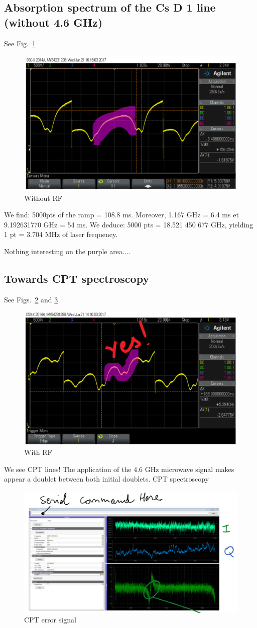 \documentclass[a4paper,11pt]{article}
\begin{document}
\subsection{Absorption spectrum of the Cs D 1 line (without 4.6 GHz)}
See Fig.~\ref{fig:absorption1}
\begin{figure}[h!]
	\centering
	\includegraphics[width=0.5\linewidth]{absorption1}
	\caption{Without RF}
	\label{fig:absorption1}
\end{figure}
We find: 5000pts of the ramp = 108.8 ms.
Moreover, 1.167 GHz = 6.4 ms et 9.192631770 GHz = 54 ms.
We deduce: 5000 pts = 18.521 450 677 GHz, yielding 1 pt = 3.704 MHz of laser frequency.

Nothing interesting on the purple area....


\subsection{Towards CPT spectroscopy}
See Figs.~\ref{fig:absorption2} and \ref{fig:errorsignal}
\begin{figure}[h!]
	\centering
	\includegraphics[width=0.5\linewidth]{absorption2}
	\caption{With RF}
	\label{fig:absorption2}
\end{figure}
We see CPT lines!
The application of the 4.6 GHz microwave signal makes appear a doublet between both initial doublets. CPT
spectroscopy

\begin{figure}[h!]
	\centering
	\includegraphics[width=0.5\linewidth]{errorsignal}
	\caption{CPT error signal}
	\label{fig:errorsignal}
\end{figure}
\end{document}
